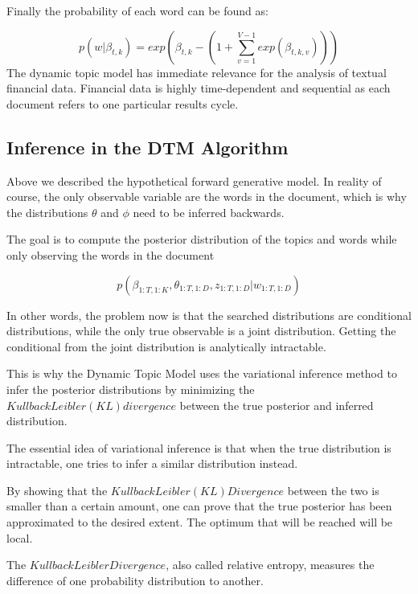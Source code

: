 \documentclass[12pt,journal,letterpaper,oneside,onecolumn]{IEEEtran}
\begin{document}
Finally the probability of each word can be found as:

\begin{equation}
p(w| \beta_{t,k}) = exp(\beta_{t,k} - (1+ \sum_{v=1}^{V-1} exp(\beta_{t,k,v})))
\end{equation}
The dynamic topic model has immediate relevance for the analysis of textual financial data. Financial data is highly time-dependent and sequential as each document refers to one particular results cycle.


\subsection{Inference in the DTM Algorithm}

Above we described the hypothetical forward generative model.
In reality of course, the only observable variable are the words in the document, which is why the distributions $\theta$ and $\phi$ need to be inferred backwards.

The goal is to compute the posterior distribution  of the topics and words while only observing the words in the document

\begin{equation}
p(\beta_{1:T, 1:K}, \theta_{1:T, 1:D}, z_{1:T, 1:D} | w_{1:T, 1:D})
\end{equation}


In other words, the problem now is that the searched distributions are conditional distributions, while the only true observable is a joint distribution. Getting the conditional from the joint distribution is analytically intractable.

This is why the Dynamic Topic Model uses the variational inference method to infer the posterior distributions by minimizing the $Kullback Leibler (KL) divergence$ between the true posterior and inferred distribution.

The essential idea of variational inference is that when the true distribution is intractable, one tries to infer a similar distribution instead. 

By showing that the $Kullback Leibler (KL) Divergence$ between the two is smaller than a certain amount, one can prove that the true posterior has been approximated to the desired extent.
The optimum that will be reached will be local.

The $Kullback Leibler Divergence$, also called relative entropy, measures the difference of one probability distribution to another.
\end{document}
